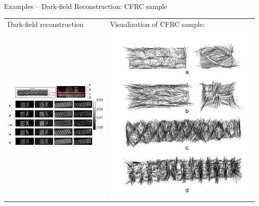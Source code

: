 \begin{frame}{Examples -- Dark-field Reconstruction: CFRC sample}
    \begin{center}
        \begin{tabular}{ll}
            Dark-field reconstruction                              & Visualization of CFRC sample:                                          \\
            \includegraphics[height=0.75\textheight]{images/CFRC.pdf} & \includegraphics[height=0.75\textheight]{images/microstructures_cfrc.pdf}
        \end{tabular}
    \end{center}
\end{frame}

